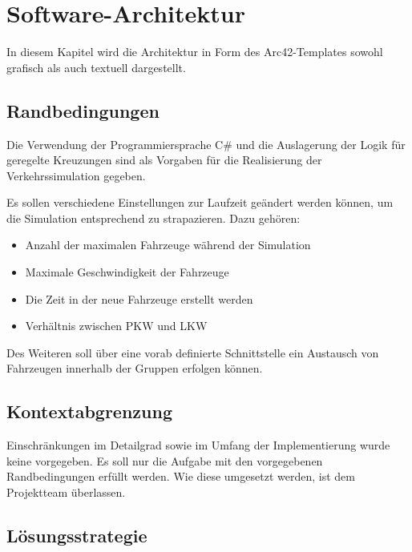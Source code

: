 
\chapter{Software-Architektur}
\label{Software-Architektur}

In diesem Kapitel wird die Architektur in Form des Arc42-Templates sowohl grafisch als auch textuell dargestellt. 

\thispagestyle{standard}
\pagestyle{standard}

\section{Randbedingungen}
\label{Randbedingungen}

Die Verwendung der Programmiersprache C\# und die Auslagerung der Logik für geregelte Kreuzungen sind als Vorgaben für die Realisierung der Verkehrssimulation gegeben. 

Es sollen verschiedene Einstellungen zur Laufzeit geändert werden können, um die Simulation entsprechend zu strapazieren. Dazu gehören:

\begin{itemize}  
\item Anzahl der maximalen Fahrzeuge während der Simulation
\item Maximale Geschwindigkeit der Fahrzeuge
\item Die Zeit in der neue Fahrzeuge erstellt werden
\item Verhältnis zwischen PKW und LKW
\end{itemize}

Des Weiteren soll über eine vorab definierte Schnittstelle ein Austausch von Fahrzeugen innerhalb der Gruppen erfolgen können.

\section{Kontextabgrenzung}
\label{Kontextabgrenzung}

Einschränkungen im Detailgrad sowie im Umfang der Implementierung wurde keine vorgegeben. Es soll nur die Aufgabe mit den vorgegebenen Randbedingungen erfüllt werden. Wie diese umgesetzt werden, ist dem Projektteam überlassen.

\section{Lösungsstrategie}
\label{Lösungsstrategie}

